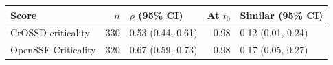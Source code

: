 \begin{tabular}{lrlrl}
\toprule
Score & $n$ & $\rho$ (95\% CI) & At $t_0$ & Similar (95\% CI) \\
\midrule
CrOSSD criticality & 330 & 0.53 (0.44, 0.61) & 0.98 & 0.12 (0.01, 0.24) \\
OpenSSF Criticality & 320 & 0.67 (0.59, 0.73) & 0.98 & 0.17 (0.05, 0.27) \\
\bottomrule
\end{tabular}
